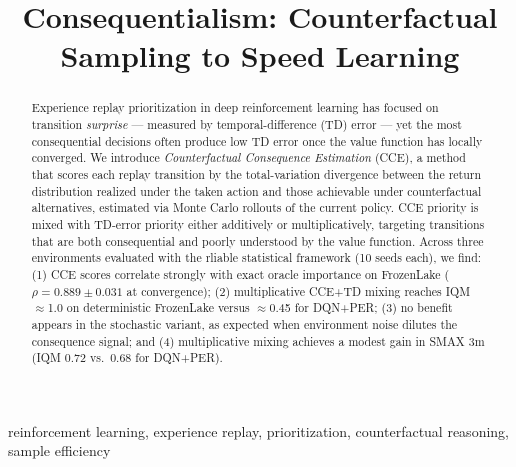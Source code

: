 \documentclass[conference]{IEEEtran}
\begin{document}
\raggedbottom

\title{Consequentialism: Counterfactual Sampling to Speed Learning}

\author{
\and
{}
}

\maketitle

\begin{abstract}
Experience replay prioritization in deep reinforcement learning has focused on transition
\emph{surprise} --- measured by temporal-difference (TD) error --- yet the most consequential
decisions often produce low TD error once the value function has locally converged.
We introduce \emph{Counterfactual Consequence Estimation} (CCE), a method that scores each
replay transition by the total-variation divergence between the return distribution realized under
the taken action and those achievable under counterfactual alternatives, estimated via Monte Carlo
rollouts of the current policy.
CCE priority is mixed with TD-error priority either additively or multiplicatively, targeting
transitions that are both consequential and poorly understood by the value function.
Across three environments evaluated with the rliable statistical framework (10 seeds each), we
find: (1) CCE scores correlate strongly with exact oracle importance on FrozenLake
($\rho = 0.889 \pm 0.031$ at convergence); (2) multiplicative CCE+TD mixing reaches IQM
$\approx$1.0 on deterministic FrozenLake versus $\approx$0.45 for DQN+PER; (3) no benefit
appears in the stochastic variant, as expected when environment noise dilutes the consequence
signal; and (4) multiplicative mixing achieves a modest gain in SMAX 3m (IQM 0.72 vs.\ 0.68
for DQN+PER).
\end{abstract}

\begin{IEEEkeywords}
reinforcement learning, experience replay, prioritization, counterfactual reasoning, sample efficiency
\end{IEEEkeywords}
\end{document}
